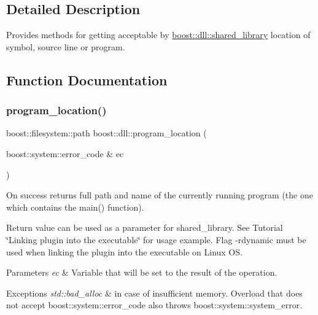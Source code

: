 \subsection{Detailed Description}
Provides methods for getting acceptable by \hyperlink{a01708}{boost\+::dll\+::shared\+\_\+library} location of symbol, source line or program. 



\subsection{Function Documentation}
\mbox{\label{a00266_file_a2e682f5c6e64ed097bf29e4490334ddf}} 
\subsubsection{\texorpdfstring{program\+\_\+location()}{program\_location()}\hspace{0.1cm}{\footnotesize\ttfamily [1/2]}}
{\footnotesize\ttfamily boost\+::filesystem\+::path boost\+::dll\+::program\+\_\+location (\begin{DoxyParamCaption}\item[{boost\+::system\+::error\+\_\+code \&}]{ec }\end{DoxyParamCaption})\hspace{0.3cm}{\ttfamily [inline]}}

On success returns full path and name of the currently running program (the one which contains the {\ttfamily main()} function).

Return value can be used as a parameter for shared\+\_\+library. See Tutorial \char`\"{}\+Linking plugin into the executable\char`\"{} for usage example. Flag \textquotesingle{}-\/rdynamic\textquotesingle{} must be used when linking the plugin into the executable on Linux OS.


\begin{DoxyParams}{Parameters}
{\em ec} & Variable that will be set to the result of the operation. \\
\hline
\end{DoxyParams}

\begin{DoxyExceptions}{Exceptions}
{\em std\+::bad\+\_\+alloc} & in case of insufficient memory. Overload that does not accept boost\+::system\+::error\+\_\+code also throws boost\+::system\+::system\+\_\+error. \\
\hline
\end{DoxyExceptions}
\mbox{\label{a00266_file_af400fcad737237876fc4a30969936063}} 
